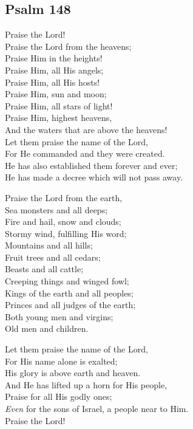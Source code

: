 \documentclass[14pt]{extbook}
\begin{document}
\newpage
\hypertarget{psalm-148}{%
\subsection{Psalm 148}\label{psalm-148}}

Praise the Lord!\\
Praise the Lord from the heavens;\\
Praise Him in the heights!\\
Praise Him, all His angels;\\
Praise Him, all His hosts!\\
Praise Him, sun and moon;\\
Praise Him, all stars of light!\\
Praise Him, highest heavens,\\
And the waters that are above the heavens!\\
Let them praise the name of the Lord,\\
For He commanded and they were created.\\
He has also established them forever and ever;\\
He has made a decree which will not pass away.

Praise the Lord from the earth,\\
Sea monsters and all deeps;\\
Fire and hail, snow and clouds;\\
Stormy wind, fulfilling His word;\\
Mountains and all hills;\\
Fruit trees and all cedars;\\
Beasts and all cattle;\\
Creeping things and winged fowl;\\
Kings of the earth and all peoples;\\
Princes and all judges of the earth;\\
Both young men and virgins;\\
Old men and children.

Let them praise the name of the Lord,\\
For His name alone is exalted;\\
His glory is above earth and heaven.\\
And He has lifted up a horn for His people,\\
Praise for all His godly ones;\\
\emph{Even} for the sons of Israel, a people near to Him.\\
Praise the Lord!
\end{document}
